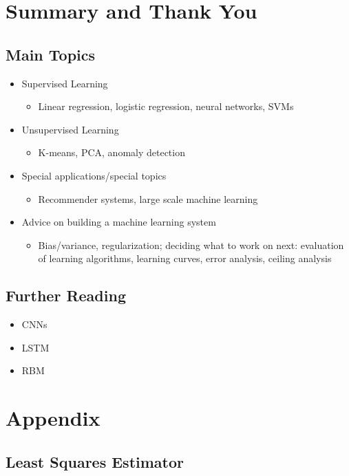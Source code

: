 \documentclass[a4paper,twoside,10pt]{article}
\begin{document}
\section{Summary and Thank You}
\subsection{Main Topics}
\begin{itemize}
  \item Supervised Learning
    \begin{itemize}
      \item Linear regression, logistic regression, neural networks, \acp{SVM}
    \end{itemize}
  \item Unsupervised Learning
    \begin{itemize}
      \item K-means, \ac{PCA}, anomaly detection
    \end{itemize}
  \item Special applications/special topics
    \begin{itemize}
      \item Recommender systems, large scale machine learning
    \end{itemize}
  \item Advice on building a machine learning system
    \begin{itemize}
      \item Bias/variance, regularization; deciding what to work on next: evaluation of learning algorithms, learning curves, error analysis, ceiling analysis
    \end{itemize}
\end{itemize}

\subsection{Further Reading}
\begin{itemize}
  \item \acp{CNN}
  \item \ac{LSTM}
  \item \ac{RBM}
\end{itemize}

\clearpage

\appendix
\section{Appendix}
\subsection{Least Squares Estimator}\label{app:lse}
\inputminted[frame=lines,linenos,fontsize=\small]{python}{least_squares.py}
\end{document}

